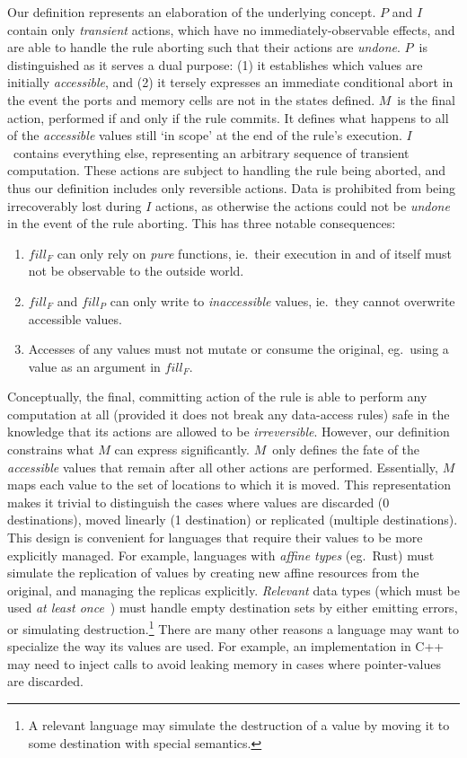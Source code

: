 Our definition represents an elaboration of the underlying concept. $P$ and $I$ contain only \textit{transient} actions, which have no immediately-observable effects, and are able to handle the rule aborting such that their actions are \textit{undone}. $P$~is distinguished as it serves a dual purpose: (1) it establishes which values are initially \textit{accessible}, and (2) it tersely expresses an immediate conditional abort in the event the ports and memory cells are not in the states defined. $M$~is the final action, performed if and only if the rule commits. It defines what happens to all of the \textit{accessible} values still `in scope' at the end of the rule's execution. $I$~contains everything else, representing an arbitrary sequence of transient computation. These actions are subject to handling the rule being aborted, and thus our definition includes only reversible actions. Data is prohibited from being irrecoverably lost during $I$ actions, as otherwise the actions could not be \textit{undone} in the event of the rule aborting. This has three notable consequences:
\begin{enumerate}
	\item $fill_F$ can only rely on \textit{pure} functions, ie.\ their execution in and of itself must not be observable to the outside world.
	\item $fill_F$ and $fill_P$ can only write to \textit{inaccessible} values, ie.\ they cannot overwrite accessible values.
	\item Accesses of any values must not mutate or consume the original, eg.\ using a value as an argument in $fill_F$.
\end{enumerate}

Conceptually, the final, committing action of the rule is able to perform any computation at all (provided it does not break any data-access rules) safe in the knowledge that its actions are allowed to be \textit{irreversible}. However, our definition constrains what $M$ can express significantly. $M$~only defines the fate of the \textit{accessible} values that remain after all other actions are performed. Essentially, $M$ maps each value to the set of locations to which it is moved. This representation makes it trivial to distinguish the cases where values are discarded (0 destinations), moved linearly (1 destination) or replicated (multiple destinations). This design is convenient for languages that require their values to be more explicitly managed. For example, languages with \textit{affine types} (eg.\ Rust) must simulate the replication of values by creating new affine resources from the original, and managing the replicas explicitly.  \textit{Relevant} data types (which must be used \textit{at least once}~\cite{walker2005substructural}) must handle empty destination sets by either emitting errors, or simulating destruction.\footnote{A relevant language may simulate the destruction of a value by moving it to some  destination with special semantics.} There are many other reasons a language may want to specialize the way its values are used. For example, an implementation in C++ may need to inject  calls to avoid leaking memory in cases where pointer-values are discarded.

